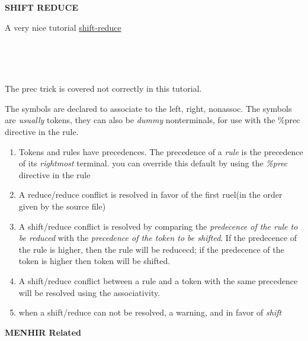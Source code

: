 \textbf{SHIFT REDUCE }
  
A very nice tutorial
\href{http://www.cs.uiuc.edu/class/sp10/cs421/lectures/lecture%2010%20supp.pdf}{shift-reduce}

\inputminted[fontsize=\scriptsize, ]{ocaml}{code/shift_reduce/s1.mly}
\inputminted[fontsize=\scriptsize, ]{ocaml}{code/shift_reduce/s2.mly}
\inputminted[fontsize=\scriptsize, ]{ocaml}{code/shift_reduce/s3.mly}
\inputminted[fontsize=\scriptsize, ]{ocaml}{code/shift_reduce/s4.mly}
\inputminted[fontsize=\scriptsize, ]{ocaml}{code/shift_reduce/s5.mly}

The prec trick is covered not correctly in this tutorial.
        
The symbols are declared to associate to the left, right,
nonassoc. The symbols are \textit{usually} tokens, they can
also be \textit{dummy} nonterminals, for use with the \%prec
directive in the rule.

\begin{enumerate}
\item Tokens and rules have precedences. The precedence of a
\textit{rule} is the precedence of its \textit{rightmost}
terminal. you can override this default by using the \textit{\%prec}
directive in the rule
\item A reduce/reduce conflict is resolved in favor of the first
ruel(in the order given by the source file)
\item A shift/reduce conflict is resolved by comparing the
\textit{predecence of the rule to be reduced} with the
\textit{precedence of the token to be shifted}. If the predecence of
the rule is higher, then the rule will be reducecd; if the predecence
of the token is higher then token will be shifted.
\item A shift/reduce conflict between a rule and a token with
the same precedence will be resolved using the associativity.
\item when a shift/reduce can not be resolved, a warning, and
in favor of \textit{shift}
\end{enumerate}


\textbf{MENHIR Related}

